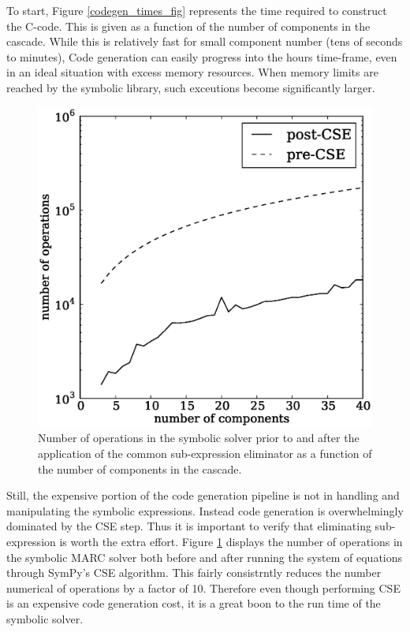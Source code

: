 \documentclass[preprint,12pt]{elsarticle}
\begin{document}
To start, Figure \ref{codegen_times_fig} represents the time required to construct 
the C-code.  This is given as a function of the number of components in the cascade.
While this is relatively fast for small component number (tens of seconds to minutes),
Code generation can easily progress into the hours time-frame, even in an ideal 
situation with excess memory resources.  When memory limits are reached by the 
symbolic library, such exceutions become significantly larger.

\begin{figure}[htpb]
\begin{center}
\includegraphics[scale=0.5]{numops.eps}
\caption{Number of operations in the symbolic solver prior to and after the 
    application of the common sub-expression eliminator as a function of the
    number of components in the cascade.}
\label{numops_fig}
\end{center}
\end{figure}

Still, the expensive portion of the code generation pipeline is not in handling 
and manipulating the symbolic expressions.  Instead code generation is overwhelmingly
dominated by the CSE step.  Thus it is important to verify that eliminating
sub-expression is worth the extra effort.  Figure \ref{numops_fig} displays the
number of operations in the symbolic MARC solver both before and after running the 
system of equations through SymPy's CSE algorithm.  This fairly consistrntly reduces
the number numerical of operations by a factor of 10.   Therefore even though
performing CSE is an expensive code generation cost, it is a great boon to the 
run time of the symbolic solver.
\end{document}
